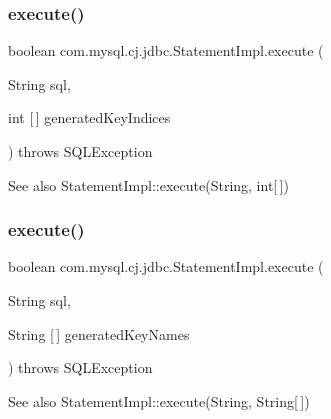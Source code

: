\subsubsection{\texorpdfstring{execute()}{execute()}\hspace{0.1cm}{\footnotesize\ttfamily [3/4]}}
{\footnotesize\ttfamily boolean com.\+mysql.\+cj.\+jdbc.\+Statement\+Impl.\+execute (\begin{DoxyParamCaption}\item[{String}]{sql,  }\item[{int \mbox{[}$\,$\mbox{]}}]{generated\+Key\+Indices }\end{DoxyParamCaption}) throws S\+Q\+L\+Exception}

\begin{DoxySeeAlso}{See also}
Statement\+Impl\+::execute(\+String, int\mbox{[}$\,$\mbox{]}) 
\end{DoxySeeAlso}
\mbox{\label{classcom_1_1mysql_1_1cj_1_1jdbc_1_1_statement_impl_a165371a7abd4d72d54a8ceaf0066aee1}} 
\subsubsection{\texorpdfstring{execute()}{execute()}\hspace{0.1cm}{\footnotesize\ttfamily [4/4]}}
{\footnotesize\ttfamily boolean com.\+mysql.\+cj.\+jdbc.\+Statement\+Impl.\+execute (\begin{DoxyParamCaption}\item[{String}]{sql,  }\item[{String \mbox{[}$\,$\mbox{]}}]{generated\+Key\+Names }\end{DoxyParamCaption}) throws S\+Q\+L\+Exception}

\begin{DoxySeeAlso}{See also}
Statement\+Impl\+::execute(\+String, String\mbox{[}$\,$\mbox{]}) 
\end{DoxySeeAlso}
\mbox{\label{classcom_1_1mysql_1_1cj_1_1jdbc_1_1_statement_impl_a812ff94727864cc68fe96aaa38dbce6a}} 
